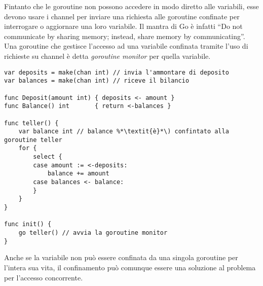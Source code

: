 Fintanto che le goroutine non possono accedere in modo diretto alle variabili, esse devono usare i channel per inviare una richiesta alle goroutine confinate per interrogare o aggiornare una loro variabile.
Il mantra di Go è infatti ``Do not communicate by sharing memory;
instead, share memory by communicating''.
Una goroutine che gestisce l'accesso ad una variabile confinata tramite l'uso di richieste su channel è detta \textit{goroutine monitor} per quella variabile.
\begin{lstlisting}[frame=single, label={lst:lstlisting9-1.6}]
var deposits = make(chan int) // invia l'ammontare di deposito
var balances = make(chan int) // riceve il bilancio

func Deposit(amount int) { deposits <- amount }
func Balance() int       { return <-balances }

func teller() {
    var balance int // balance %*\textit{è}*\) confintato alla goroutine teller
    for {
        select {
        case amount := <-deposits:
            balance += amount
        case balances <- balance:
        }
    }
}

func init() {
    go teller() // avvia la goroutine monitor
}
\end{lstlisting}
Anche se la variabile non può essere confinata da una singola goroutine per l'intera sua vita, il confinamento può comunque essere una soluzione al problema per l'accesso concorrente.


